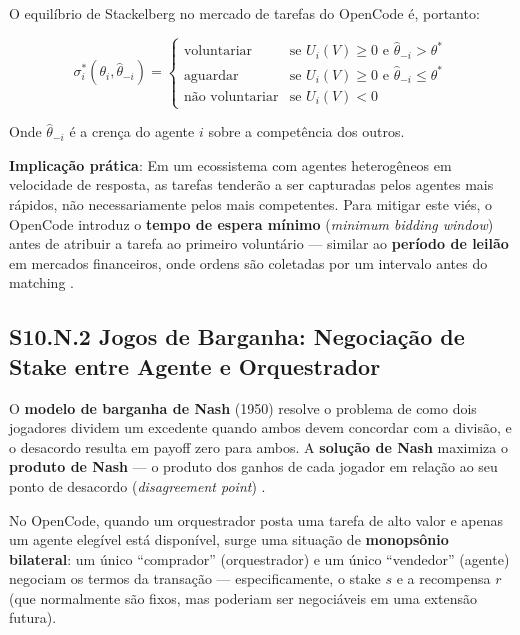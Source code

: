 O equilíbrio de Stackelberg no mercado de tarefas do OpenCode é, portanto:

\begin{equation}\label{eq:stackelberg_task}
\sigma_i^*(\theta_i, \hat{\theta}_{-i}) = \begin{cases}
\text{voluntariar} & \text{se } U_i(V) \geq 0 \text{ e } \hat{\theta}_{-i} > \theta^* \\
\text{aguardar} & \text{se } U_i(V) \geq 0 \text{ e } \hat{\theta}_{-i} \leq \theta^* \\
\text{não voluntariar} & \text{se } U_i(V) < 0
\end{cases}
\end{equation}

Onde $\hat{\theta}_{-i}$ é a crença do agente $i$ sobre a competência dos outros.

\textbf{Implicação prática}: Em um ecossistema com agentes heterogêneos em velocidade de resposta, as tarefas tenderão a ser capturadas pelos agentes mais rápidos, não necessariamente pelos mais competentes. Para mitigar este viés, o OpenCode introduz o \textbf{tempo de espera mínimo} (\textit{minimum bidding window}) antes de atribuir a tarefa ao primeiro voluntário --- similar ao \textbf{período de leilão} em mercados financeiros, onde ordens são coletadas por um intervalo antes do matching \cite{budish2015high}.

\subsection*{S10.N.2 Jogos de Barganha: Negociação de Stake entre Agente e Orquestrador}

O \textbf{modelo de barganha de Nash} (1950) resolve o problema de como dois jogadores dividem um excedente quando ambos devem concordar com a divisão, e o desacordo resulta em payoff zero para ambos. A \textbf{solução de Nash} maximiza o \textbf{produto de Nash} --- o produto dos ganhos de cada jogador em relação ao seu ponto de desacordo (\textit{disagreement point}) \cite{nash1950bargaining}.

No OpenCode, quando um orquestrador posta uma tarefa de alto valor e apenas um agente elegível está disponível, surge uma situação de \textbf{monopsônio bilateral}: um único ``comprador'' (orquestrador) e um único ``vendedor'' (agente) negociam os termos da transação --- especificamente, o stake $s$ e a recompensa $r$ (que normalmente são fixos, mas poderiam ser negociáveis em uma extensão futura).

